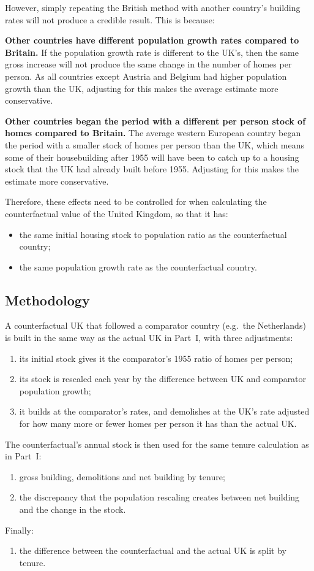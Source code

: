 \documentclass[11pt,a4paper]{article}
\begin{document}
However, simply repeating the British method with another country's building rates will
not produce a credible result. This is because:

\textbf{Other countries have different population growth rates compared to Britain.} If
the population growth rate is different to the UK's, then the same gross increase will not
produce the same change in the number of homes per person. As all countries except
Austria and Belgium had higher population growth than the UK, adjusting for this makes the
average estimate more conservative.

\textbf{Other countries began the period with a different per person stock of homes
compared to Britain.} The average western European country began the period with a
smaller stock of homes per person than the UK, which means some of their housebuilding
after 1955 will have been to catch up to a housing stock that the UK had already built
before 1955. Adjusting for this makes the estimate more conservative.

Therefore, these effects need to be controlled for when calculating the counterfactual
value of the United Kingdom, so that it has:
\begin{itemize}
  \item the same initial housing stock to population ratio as the counterfactual country;
  \item the same population growth rate as the counterfactual country.
\end{itemize}

\subsection*{Methodology}

A counterfactual UK that followed a comparator country (e.g.\ the Netherlands) is built in
the same way as the actual UK in Part~I, with three adjustments:
\begin{enumerate}
  \item its initial stock gives it the comparator's 1955 ratio of homes per person;
  \item its stock is rescaled each year by the difference between UK and comparator
        population growth;
  \item it builds at the comparator's rates, and demolishes at the UK's rate adjusted for
        how many more or fewer homes per person it has than the actual UK.
\end{enumerate}
The counterfactual's annual stock is then used for the same tenure calculation as in
Part~I:
\begin{enumerate}[resume]
  \item gross building, demolitions and net building by tenure;
  \item the discrepancy that the population rescaling creates between net building and
        the change in the stock.
\end{enumerate}
Finally:
\begin{enumerate}[resume]
  \item the difference between the counterfactual and the actual UK is split by tenure.
\end{enumerate}
\end{document}
